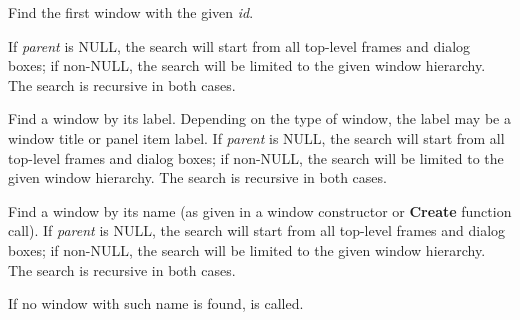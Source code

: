 

\label{wxwindowfindwindowbyid}


Find the first window with the given {\it id}.

If {\it parent} is NULL, the search will start from all top-level
frames and dialog boxes; if non-NULL, the search will be limited to the given window hierarchy.
The search is recursive in both cases.




\label{wxwindowfindwindowbylabel}


Find a window by its label. Depending on the type of window, the label may be a window title
or panel item label. If {\it parent} is NULL, the search will start from all top-level
frames and dialog boxes; if non-NULL, the search will be limited to the given window hierarchy.
The search is recursive in both cases.




\label{wxwindowfindwindowbyname}


Find a window by its name (as given in a window constructor or {\bf Create} function call).
If {\it parent} is NULL, the search will start from all top-level
frames and dialog boxes; if non-NULL, the search will be limited to the given window hierarchy.
The search is recursive in both cases.

If no window with such name is found,
 is called.

